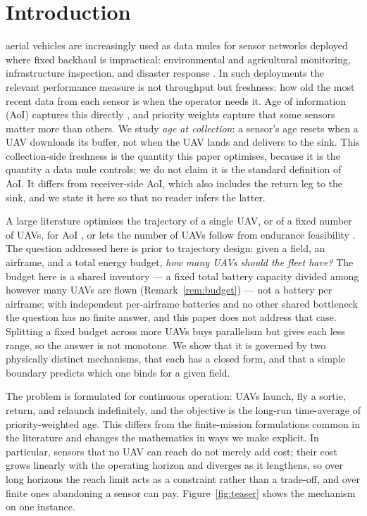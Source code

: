 \documentclass[journal,outdir=./]{IEEEtran}
\begin{document}
\IEEEpeerreviewmaketitle

\section{Introduction}\label{sec:intro}
 aerial vehicles are increasingly used as data mules for sensor networks deployed where fixed backhaul is impractical: environmental and agricultural monitoring, infrastructure inspection, and disaster response \cite{wei2022survey,mozaffari2019tutorial}. In such deployments the relevant performance measure is not throughput but freshness: how old the most recent data from each sensor is when the operator needs it. Age of information (AoI) captures this directly \cite{yates2021aoi}, and priority weights capture that some sensors matter more than others. We study \emph{age at collection}: a sensor's age resets when a UAV downloads its buffer, not when the UAV lands and delivers to the sink. This collection-side freshness is the quantity this paper optimises, because it is the quantity a data mule controls; we do not claim it is the standard definition of AoI. It differs from receiver-side AoI, which also includes the return leg to the sink, and we state it here so that no reader infers the latter.

A large literature optimises the trajectory of a single UAV, or of a fixed number of UAVs, for AoI \cite{amodu2023review,abdelmagid2019peak}, or lets the number of UAVs follow from endurance feasibility \cite{gao2023aoi}. The question addressed here is prior to trajectory design: given a field, an airframe, and a total energy budget, \emph{how many UAVs should the fleet have?} The budget here is a shared inventory --- a fixed total battery capacity divided among however many UAVs are flown (Remark~\ref{rem:budget}) --- not a battery per airframe; with independent per-airframe batteries and no other shared bottleneck the question has no finite answer, and this paper does not address that case. Splitting a fixed budget across more UAVs buys parallelism but gives each less range, so the answer is not monotone. We show that it is governed by two physically distinct mechanisms, that each has a closed form, and that a simple boundary predicts which one binds for a given field.

The problem is formulated for continuous operation: UAVs launch, fly a sortie, return, and relaunch indefinitely, and the objective is the long-run time-average of priority-weighted age. This differs from the finite-mission formulations common in the literature and changes the mathematics in ways we make explicit. In particular, sensors that no UAV can reach do not merely add cost; their cost grows linearly with the operating horizon and diverges as it lengthens, so over long horizons the reach limit acts as a constraint rather than a trade-off, and over finite ones abandoning a sensor can pay. Figure~\ref{fig:teaser} shows the mechanism on one instance.
\end{document}
